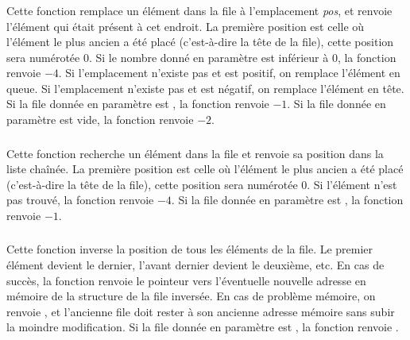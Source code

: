 \subsubsection*{}

\noindent Cette fonction remplace un élément dans la file à l'emplacement \textit{pos}, et renvoie l'élément qui était présent à cet endroit.
La première position est celle où l'élément le plus ancien a été placé (c'est-à-dire la tête de la file), cette position sera numérotée $ 0 $.
Si le nombre donné en paramètre est inférieur à $ 0 $, la fonction renvoie $ -4 $.
Si l'emplacement n'existe pas et est positif, on remplace l'élément en queue.
Si l'emplacement n'existe pas et est négatif, on remplace l'élément en tête.
Si la file donnée en paramètre est , la fonction renvoie $ -1 $.
Si la file donnée en paramètre est vide, la fonction renvoie $ -2 $.


\subsubsection*{}

\noindent Cette fonction recherche un élément dans la file et renvoie sa position dans la liste chaînée.
La première position est celle où l'élément le plus ancien a été placé (c'est-à-dire la tête de la file), cette position sera numérotée $ 0 $.
Si l'élément n'est pas trouvé, la fonction renvoie $ -4 $.
Si la file donnée en paramètre est , la fonction renvoie $ -1 $.


\subsubsection*{}

\noindent Cette fonction inverse la position de tous les éléments de la file.
Le premier élément devient le dernier, l'avant dernier devient le deuxième, etc.
En cas de succès, la fonction renvoie le pointeur vers l'éventuelle nouvelle adresse en mémoire de la structure de la file inversée.
En cas de problème mémoire, on renvoie , et l'ancienne file doit rester à son ancienne adresse mémoire sans subir la moindre modification.
Si la file donnée en paramètre est , la fonction renvoie .



